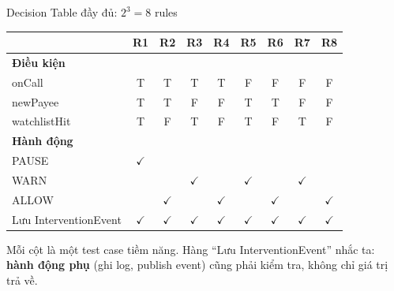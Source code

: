 \documentclass[aspectratio=169,12pt]{beamer}
\begin{document}
\begin{frame}[shrink=6]{Decision Table đầy đủ: $2^3 = 8$ rules}
  \begin{center}
  \small
  \setlength{\tabcolsep}{5pt}
  \begin{tabular}{lcccccccc}
    \toprule
    & \textbf{R1} & \textbf{R2} & \textbf{R3} & \textbf{R4} & \textbf{R5} & \textbf{R6} & \textbf{R7} & \textbf{R8} \\
    \midrule
    \textbf{Điều kiện} & & & & & & & & \\
    \quad onCall       & T & T & T & T & F & F & F & F \\
    \quad newPayee     & T & T & F & F & T & T & F & F \\
    \quad watchlistHit & T & F & T & F & T & F & T & F \\
    \midrule
    \textbf{Hành động} & & & & & & & & \\
    \quad PAUSE  & $\checkmark$ & & & & & & & \\
    \quad WARN   & & & $\checkmark$ & & $\checkmark$ & & $\checkmark$ & \\
    \quad ALLOW  & & $\checkmark$ & & $\checkmark$ & & $\checkmark$ & & $\checkmark$ \\
    \quad Lưu InterventionEvent & $\checkmark$ & $\checkmark$ & $\checkmark$ & $\checkmark$ & $\checkmark$ & $\checkmark$ & $\checkmark$ & $\checkmark$ \\
    \bottomrule
  \end{tabular}
  \end{center}

  \vspace{0.3em}
  {\small Mỗi cột là một test case tiềm năng. Hàng ``Lưu InterventionEvent''
  nhắc ta: \textbf{hành động phụ} (ghi log, publish event) cũng phải kiểm tra,
  không chỉ giá trị trả về.}
\end{frame}
\end{document}
